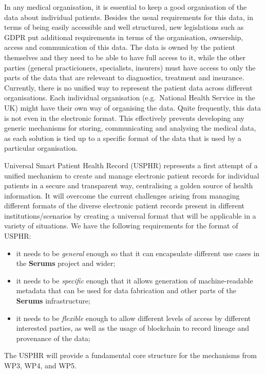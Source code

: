 In any medical organisation, it is essential to keep a good organisation of the data about individual patients. Besides the usual requirements for this data, in terms of being easily accessible and well structured, new legislations such as GDPR put additional requirements in terms of the organisation, ownership, access and communication of this data. The data is owned by the patient themselves and they need to be able to have full access to it, while the other parties (general practicioners, specialists, insurers) must have access to only the parts of the data that are releveant to diagnostics, treatment and insurance. Currently, there is no unified way to represent the patient data across different organisations. Each individual organisation (e.g.~National Health Service in the UK) might have their own way of organising the data. Quite frequently, this data is not even in the electronic format. This effectively prevents developing any generic mechanisms for storing, communicating and analysing the medical data, as each solution is tied up to a specific format of the data that is used by a particular organisation.

Universal Smart Patient Health Record (USPHR) represents a first attempt of a unified mechanism to create and manage electronic patient records for individual patients in a secure and transparent way, centralising a golden source of health information. It will overcome the current challenges arising from managing different formats of the diverse electronic patient records present in different institutions/scenarios by creating a universal format that will be applicable in a variety of situations. We have the following requirements for the format of USPHR:

\begin{itemize}
\item it needs to be \emph{general} enough so that it can encapsulate different use cases in the \textbf{Serums} project and wider;
  \item it needs to be \emph{specific} enough that it allows generation of machine-readable metadata that can be used for data fabrication and other parts of the \textbf{Serums} infrastructure;
  \item it needs to be \emph{flexible} enough to allow different levels of access by different interested parties, as well as the usage of blockchain to record lineage and provenance of the data;
\end{itemize}

\noindent
The USPHR will provide a fundamental core structure for the mechanisms from WP3, WP4, and WP5.
